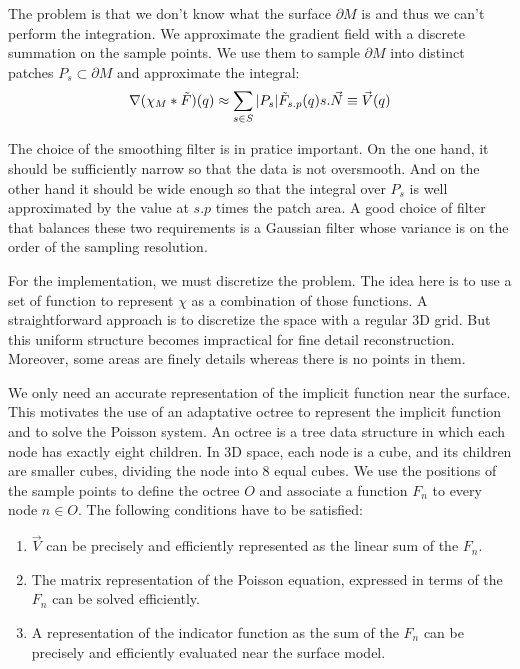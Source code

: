 \documentclass[a4paper]{article}
\begin{document}
The problem is that we don't know what the surface $\partial M$ is and thus we can't perform the integration. We approximate the gradient field with a discrete summation on the sample points. We use them to sample $\partial M$ into distinct patches $P_s \subset \partial M$ and approximate the integral:
$$\nabla(\chi_M * \tilde{F})(q) \approx \sum_{s \in S} \\|P_s\\| \tilde{F}_{s.p}(q) s.\vec{N} \equiv \vec{V}(q)$$

The choice of the smoothing filter is in pratice important. On the one hand, it should be sufficiently narrow so that the data is not oversmooth. And on the other hand it should be wide enough so that the integral over $P_s$ is well approximated by the value at $s.p$ times the patch area. A good choice of filter that balances these two requirements is a Gaussian filter whose variance is on the order of the sampling resolution.

For the implementation, we must discretize the problem. The idea here is to use a set of function to represent $\chi$ as a combination of those functions. A straightforward approach is to discretize the space with a regular 3D grid. But this uniform structure becomes impractical for fine detail reconstruction. Moreover, some areas are finely details whereas there is no points in them.

We only need an accurate representation of the implicit function near the surface. This motivates the use of an adaptative octree to represent the implicit function and to solve the Poisson system. An octree is a tree data structure in which each node has exactly eight children. In 3D space, each node is a cube, and its children are smaller cubes, dividing the node into 8 equal cubes. We use the positions of the sample points to define the octree $O$ and associate a function $F_n$ to every node $n \in O$. The following conditions have to be satisfied:
\begin{enumerate}
\item $\vec{V}$ can be precisely and efficiently represented as the linear sum of the $F_n$.
\item The matrix representation of the Poisson equation, expressed in terms of the $F_n$ can be solved efficiently.
\item A representation of the indicator function as the sum of the $F_n$ can be precisely and efficiently evaluated near the surface model.
\end{enumerate}
\end{document}
